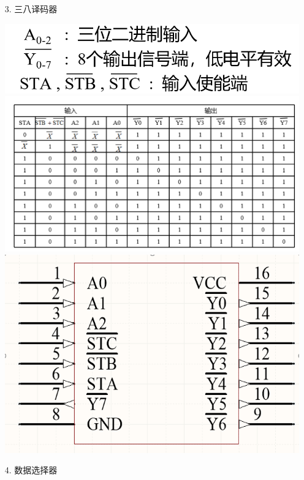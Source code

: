 \documentclass[UTF8]{ctexart}
\begin{document}
\begin{enumerate}
\begin{itemize}
\begin{itemize}
                        \item [3.] 三八译码器 
                        \begin{center}
                            \includegraphics[scale = 0.4]{2.png}
                            \label{fig:label}
                            \includegraphics[scale = 0.4]{3.png}
                            \label{fig:label}
                            \includegraphics[scale = 0.4]{4.png}                          
                            \label{fig:label}
                        \end{center}
                        \item [4.] 数据选择器
                        \begin{center}

\end{center}
\end{itemize}
\end{itemize}
\end{enumerate}
\end{document}
